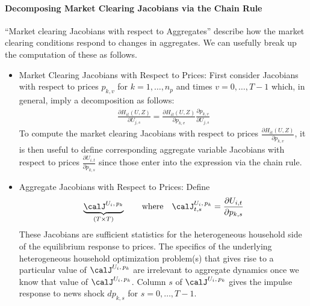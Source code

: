 \documentclass[12pt]{article}
\theoremstyle{plain}
\theoremstyle{definition}
\theoremstyle{remark}
\begin{document}
\paragraph{Decomposing Market Clearing Jacobians via the Chain Rule}
``Market clearing Jacobians with respect to Aggregates'' describe how
the market clearing conditions respond to changes in aggregates.
We can usefully break up the computation of these as follows.
\begin{itemize}
  \item Market Clearing Jacobians with Respect to Prices:
    First consider Jacobians with respect to prices $p_{k,v}$ for
    $k=1,\ldots,n_p$ and times $v=0,\ldots,T-1$ which, in general, imply
    a decomposition as follows:
    \begin{align*}
      \frac{\partial H_{it}(U,Z)}{\partial U_{j,s}}
      =
      \frac{\partial H_{it}(U,Z)}{\partial p_{k,v}}
      \frac{\partial p_{k,v}}{\partial U_{j,s}}
    \end{align*}
    To compute the market clearing Jacobians with respect to prices
    $\frac{\partial H_{it}(U,Z)}{\partial p_{k,v}}$,
    it is then useful to define corresponding aggregate variable Jacobians
    with respect to prices $\frac{\partial U_{i,t}}{\partial p_{k,s}}$
    since those enter into the expression via the chain rule.

  \item Aggregate Jacobians with Respect to Prices:
    Define
    \begin{align*}
      \underbrace{%
        \calJ^{U_i,\,p_k}
      }_{%
        (T\times T)
      }
      \qquad\text{where}\quad
      \calJ^{U_i,\,p_k}_{t,s}
      =
      \frac{\partial U_{i,t}}{\partial p_{k,s}}
    \end{align*}
    These Jacobians are sufficient statistics for the heterogeneous
    household side of the equilibrium response to prices.
    The specifics of the underlying heterogeneous household optimization
    problem(s) that gives rise to a particular value of
    $\calJ^{U_i,\,p_k}$
    are irrelevant to aggregate dynamics once we know
    that value of $\calJ^{U_i,\,p_k}$.
    Column $s$ of $\calJ^{U_i,\,p_k}$ gives the impulse response to news
    shock $dp_{k,s}$ for $s=0,\ldots,T-1$.
\end{itemize}
\end{document}
